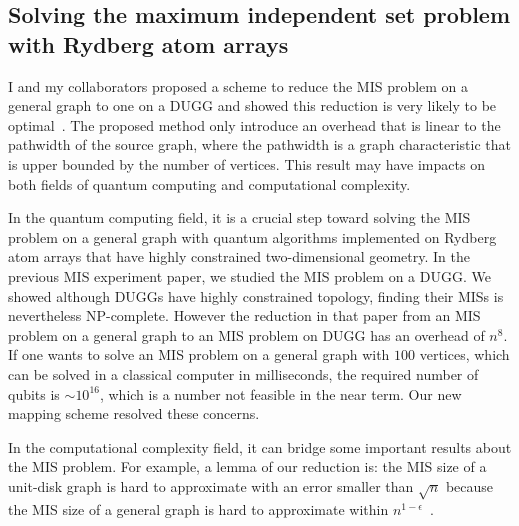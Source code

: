 \documentclass[a4paper]{article}
\newcommand{\<}{\langle}
\renewcommand{\>}{\rangle}
\begin{document}

\subsection{Solving the maximum independent set problem with Rydberg atom arrays}
I and my collaborators proposed a scheme to reduce the MIS problem on a general graph to one on a DUGG and showed this reduction is very likely to be optimal~\cite{Liu2022b}.
The proposed method only introduce an overhead that is linear to the pathwidth of the source graph, where the pathwidth is a graph characteristic that is upper bounded by the number of vertices.
This result may have impacts on both fields of quantum computing and computational complexity.

In the quantum computing field, it is a crucial step toward solving the MIS problem on a general graph with quantum algorithms implemented on Rydberg atom arrays that have highly constrained two-dimensional geometry.
In the previous MIS experiment paper, we studied the MIS problem on a DUGG. We showed although DUGGs have highly constrained topology, finding their MISs is nevertheless NP-complete.
However the reduction in that paper from an MIS problem on a general graph to an MIS problem on DUGG has an overhead of $n^8$.
If one wants to solve an MIS problem on a general graph with $100$ vertices, which can be solved in a classical computer in milliseconds, the required number of qubits is $\sim10^{16}$, which is a number not feasible in the near term.
Our new mapping scheme resolved these concerns.

In the computational complexity field, it can bridge some important results about the MIS problem. For example, a lemma of our reduction is: the MIS size of a unit-disk graph is hard to approximate with an error smaller than $\sqrt{n}$ because the MIS size of a general graph is hard to approximate within $n^{1-\epsilon}$~\cite{Hastad1996}.
\end{document}
